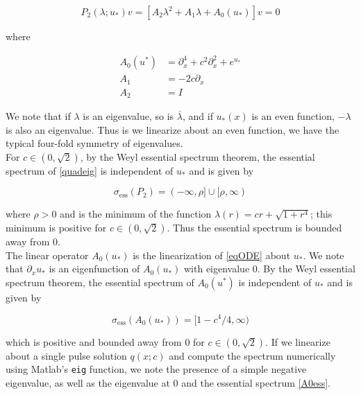 \documentclass[12pt]{article}
\begin{document}
\begin{equation}\label{quadeig2}
P_2(\lambda; u_*)v =  [A_2 \lambda^2 + A_1 \lambda + A_0(u_*)]v = 0
\end{equation}

where

\begin{align}
A_0(u^*) &= \partial_x^4 + c^2 \partial_x^2 + e^{u_*} \\
A_1 &= -2 c \partial_x \\
A_2 &= I
\end{align}

We note that if $\lambda$ is an eigenvalue, so is $\overline{\lambda}$, and if $u_*(x)$ is an even function, $-\lambda$ is also an eigenvalue. Thus is we linearize about an even function, we have the typical four-fold symmetry of eigenvalues.\\

For $c \in (0, \sqrt{2})$, by the Weyl essential spectrum theorem, the essential spectrum of \eqref{quadeig} is independent of $u_*$ and is given by

\begin{equation}\label{ess}
\sigma_{\text{ess}}(P_2) = (-\infty, \rho] \cup [\rho, \infty)
\end{equation}

where $\rho > 0$ and is the minimum of the function $\lambda(r) = c r + \sqrt{1 + r^4}$; this minimum is positive for $c \in (0, \sqrt{2})$. Thus the essential spectrum is bounded away from 0.\\

The linear operator $A_0(u_*)$ is the linearization of \eqref{eqODE} about $u_*$. We note that $\partial_x u_*$ is an eigenfunction of $A_0(u_*)$ with eigenvalue 0. By the Weyl essential spectrum theorem, the essential spectrum of $A_0(u^*)$ is independent of $u_*$ and is given by

\begin{equation}\label{A0ess}
\sigma_{\text{ess}}(A_0(u_*)) = [1 - c^4/4, \infty)
\end{equation}

which is positive and bounded away from 0 for $c \in (0, \sqrt{2})$. If we linearize about a single pulse solution $q(x; c)$ and compute the spectrum numerically using Matlab's \texttt{eig} function, we note the presence of a simple negative eigenvalue, as well as the eigenvalue at 0 and the essential spectrum \eqref{A0ess}.
\end{document}
